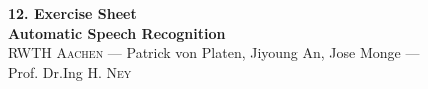 \documentclass[12pt,oneside,a4paper]{article}
\begin{document}
\begin{center}
{\LARGE \bfseries 
 12. Exercise Sheet  \\[0.1cm] 

}
{ \large \bfseries
 Automatic Speech Recognition \\[0.3cm] %
}
{\large
  \textsc{RWTH Aachen} --- Patrick von Platen, Jiyoung An, Jose Monge ---\\[0.3cm]
}
{\normalsize
  Prof. Dr.Ing H. \textsc{Ney} \\[0.92cm] %
}
\end{center}
 
 \newpage


\end{document}
